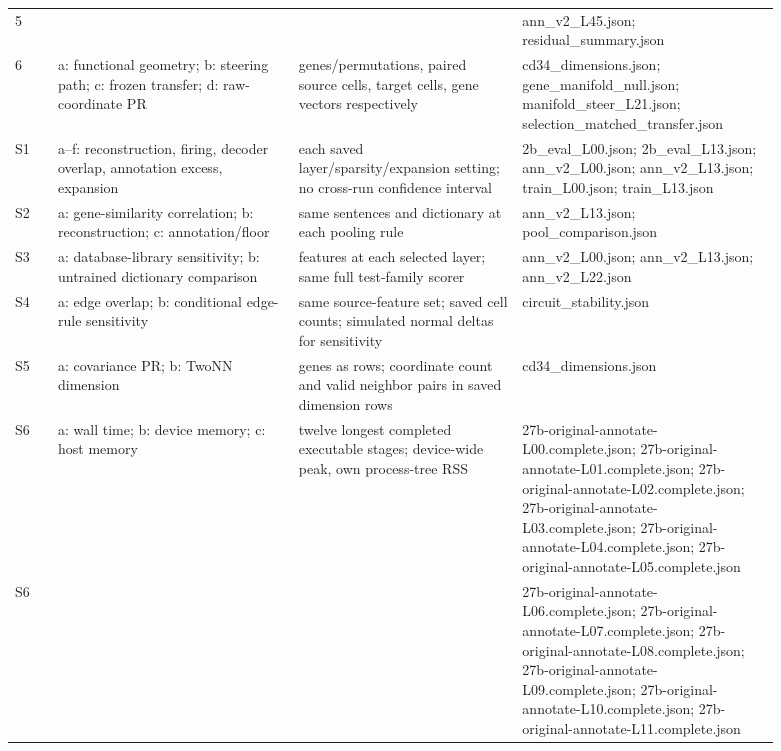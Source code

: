 \begin{longtable}{@{}L{0.05\linewidth}L{0.28\linewidth}L{0.26\linewidth}L{0.3\linewidth}@{}}
5 &  &  & ann\_\allowbreak{}v2\_\allowbreak{}L45.json; residual\_\allowbreak{}summary.json \\
6 & a: functional geometry; b: steering path; c: frozen transfer; d: raw-coordinate PR & genes/permutations, paired source cells, target cells, gene vectors respectively & cd34\_\allowbreak{}dimensions.json; gene\_\allowbreak{}manifold\_\allowbreak{}null.json; manifold\_\allowbreak{}steer\_\allowbreak{}L21.json; selection\_\allowbreak{}matched\_\allowbreak{}transfer.json \\
S1 & a--f: reconstruction, firing, decoder overlap, annotation excess, expansion & each saved layer/sparsity/expansion setting; no cross-run confidence interval & 2b\_\allowbreak{}eval\_\allowbreak{}L00.json; 2b\_\allowbreak{}eval\_\allowbreak{}L13.json; ann\_\allowbreak{}v2\_\allowbreak{}L00.json; ann\_\allowbreak{}v2\_\allowbreak{}L13.json; train\_\allowbreak{}L00.json; train\_\allowbreak{}L13.json \\
S2 & a: gene-similarity correlation; b: reconstruction; c: annotation/floor & same sentences and dictionary at each pooling rule & ann\_\allowbreak{}v2\_\allowbreak{}L13.json; pool\_\allowbreak{}comparison.json \\
S3 & a: database-library sensitivity; b: untrained dictionary comparison & features at each selected layer; same full test-family scorer & ann\_\allowbreak{}v2\_\allowbreak{}L00.json; ann\_\allowbreak{}v2\_\allowbreak{}L13.json; ann\_\allowbreak{}v2\_\allowbreak{}L22.json \\
S4 & a: edge overlap; b: conditional edge-rule sensitivity & same source-feature set; saved cell counts; simulated normal deltas for sensitivity & circuit\_\allowbreak{}stability.json \\
S5 & a: covariance PR; b: TwoNN dimension & genes as rows; coordinate count and valid neighbor pairs in saved dimension rows & cd34\_\allowbreak{}dimensions.json \\
S6 & a: wall time; b: device memory; c: host memory & twelve longest completed executable stages; device-wide peak, own process-tree RSS & 27b-original-annotate-L00.complete.json; 27b-original-annotate-L01.complete.json; 27b-original-annotate-L02.complete.json; 27b-original-annotate-L03.complete.json; 27b-original-annotate-L04.complete.json; 27b-original-annotate-L05.complete.json \\
S6 &  &  & 27b-original-annotate-L06.complete.json; 27b-original-annotate-L07.complete.json; 27b-original-annotate-L08.complete.json; 27b-original-annotate-L09.complete.json; 27b-original-annotate-L10.complete.json; 27b-original-annotate-L11.complete.json \\

\end{longtable}
